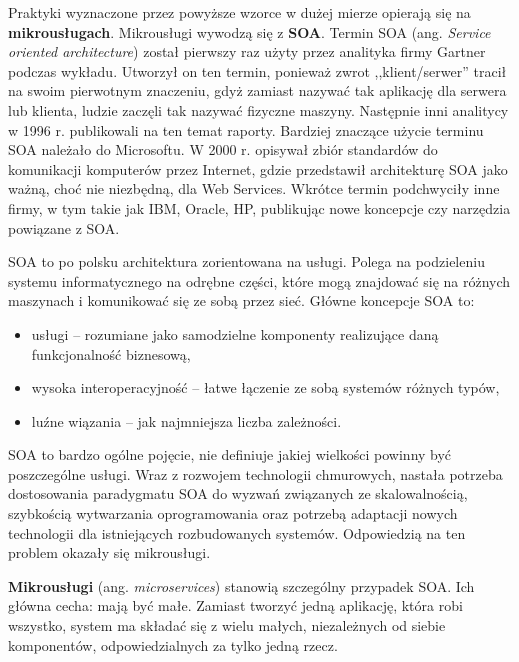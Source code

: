 \documentclass[12pt,a4paper,twoside,titlepage,openright]{book}
\begin{document}
Praktyki wyznaczone przez powyższe wzorce w dużej mierze opierają się na \textbf{mikrousługach}. Mikrousługi wywodzą się z \textbf{SOA}. Termin SOA (ang. \textit{Service oriented architecture}) został pierwszy raz użyty przez analityka firmy Gartner podczas wykładu. Utworzył on ten termin, ponieważ zwrot ,,klient/serwer'' tracił na swoim pierwotnym znaczeniu, gdyż zamiast nazywać tak aplikację dla serwera lub klienta, ludzie zaczęli tak nazywać fizyczne maszyny. Następnie inni analitycy w 1996 r. publikowali na ten temat raporty. Bardziej znaczące użycie terminu SOA należało do Microsoftu. W 2000 r. opisywał zbiór standardów do komunikacji komputerów przez Internet, gdzie przedstawił architekturę SOA jako ważną, choć nie niezbędną, dla Web Services. Wkrótce termin podchwyciły inne firmy, w tym  takie jak IBM, Oracle, HP, publikując nowe koncepcje czy narzędzia powiązane z SOA. \cite{soaOreily}

SOA to po polsku architektura zorientowana na usługi. Polega na podzieleniu systemu informatycznego na odrębne części, które mogą znajdować się na różnych maszynach i komunikować się ze sobą przez sieć. Główne koncepcje SOA to: 
\begin{itemize}
\item usługi -- rozumiane jako samodzielne komponenty realizujące daną funkcjonalność biznesową,
\item wysoka interoperacyjność -- łatwe łączenie ze sobą systemów różnych typów,
\item luźne wiązania -- jak najmniejsza liczba zależności. \cite{soaOreily}
\end{itemize}

SOA to bardzo ogólne pojęcie, nie definiuje jakiej wielkości powinny być poszczególne usługi. Wraz z rozwojem technologii chmurowych, nastała potrzeba dostosowania paradygmatu SOA do wyzwań związanych ze skalowalnością, szybkością wytwarzania oprogramowania oraz potrzebą adaptacji nowych technologii dla istniejących rozbudowanych systemów. Odpowiedzią na ten problem okazały się mikrousługi.

\textbf{Mikrousługi} (ang. \textit{microservices}) stanowią szczególny przypadek SOA. Ich główna cecha: mają być małe. Zamiast tworzyć jedną aplikację, która robi wszystko, system ma składać się z wielu małych, niezależnych od siebie komponentów, odpowiedzialnych za tylko jedną rzecz. \cite{microservicesPacktNetCore}
\end{document}
